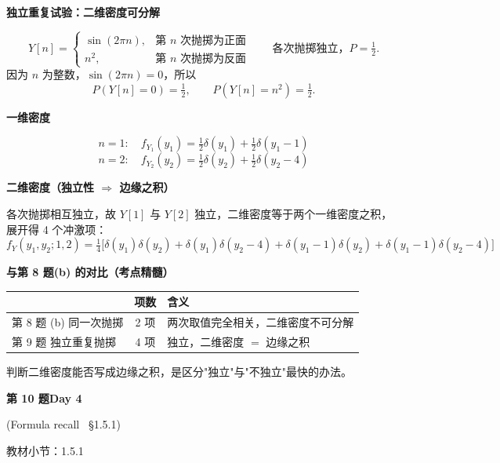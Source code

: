 \documentclass[10.5pt,fontset=fandol]{ctexart}
\newcommand{\key}[1]{\par\vspace{4pt}\noindent\textbf{\color{navy}#1}\par\vspace{2pt}}
\newcommand{\qtitle}[2]{\par\addvspace{1.2em}\Needspace{8\baselineskip}\begin{tcolorbox}[colback=navy,colframe=navy,arc=1.5pt,boxrule=0pt]\color{white}\large\bfseries #1\hfill\small #2\end{tcolorbox}}
\begin{document}
\noindent\textbf{独立重复试验：二维密度可分解}\par\smallskip\begin{tcolorbox}[breakable,colback=qbg,colframe=qbg,boxrule=0pt]\[
Y[n]=\begin{cases}\sin(2\pi n), & \text{第 } n \text{ 次抛掷为正面}\\[2pt] n^2, & \text{第 } n \text{ 次抛掷为反面}\end{cases}
\qquad\text{各次抛掷独立，}P=\tfrac12 .
\]
因为 $n$ 为整数，$\sin(2\pi n)=0$，所以
\[
P(Y[n]=0)=\tfrac12,\qquad P(Y[n]=n^2)=\tfrac12 .
\]

\key{一维密度}
\[
n=1:\quad f_{Y_1}(y_1)=\tfrac12\delta(y_1)+\tfrac12\delta(y_1-1)
\]
\[
n=2:\quad f_{Y_2}(y_2)=\tfrac12\delta(y_2)+\tfrac12\delta(y_2-4)
\]

\key{二维密度（独立性 $\Rightarrow$ 边缘之积）}
各次抛掷相互独立，故 $Y[1]$ 与 $Y[2]$ 独立，二维密度等于两个一维密度之积，展开得 4 个冲激项：
\[
\boxed{f_Y(y_1,y_2;1,2)=\tfrac14\Big[\delta(y_1)\delta(y_2)+\delta(y_1)\delta(y_2-4)
+\delta(y_1-1)\delta(y_2)+\delta(y_1-1)\delta(y_2-4)\Big]}
\]

\key{与第 8 题(b) 的对比（考点精髓）}
\begin{center}
\renewcommand{\arraystretch}{1.3}
\small
\begin{tabularx}{\textwidth}{@{}L{3.4cm} c X@{}}
\toprule
& \textbf{项数} & \textbf{含义} \\
\midrule
第 8 题 (b) 同一次抛掷 & 2 项 & 两次取值完全相关，二维密度不可分解 \\
第 9 题 独立重复抛掷 & 4 项 & 独立，二维密度 $=$ 边缘之积 \\
\bottomrule
\end{tabularx}
\end{center}
判断二维密度能否写成边缘之积，是区分"独立"与"不独立"最快的办法。
\end{tcolorbox}
\qtitle{第 10 题}{Day 4}
{\small\color{accentred}(Formula recall \textemdash\ \S1.5.1)}\par\smallskip
{\small\color{muted}教材小节：1.5.1}\par\medskip
\end{document}
